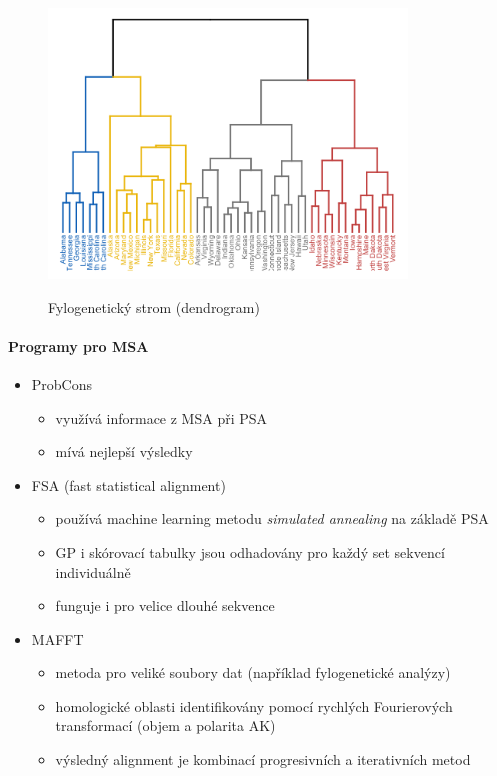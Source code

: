 \documentclass[DIV=8]{scrreprt}
\begin{document}
\begin{figure}
    \caption{Fylogenetický strom (dendrogram)}
    \includegraphics[width=0.85\textwidth]{dendrogram.png}
    \centering
    \label{}
\end{figure}


\paragraph{Programy pro MSA}
\begin{itemize}[nosep]
    \item ProbCons
\begin{itemize}[nosep]
    \item využívá informace z MSA při PSA
    \item mívá nejlepší výsledky
\end{itemize}

    \item FSA (fast statistical alignment)
\begin{itemize}[nosep]
    \item používá machine learning metodu \emph{simulated annealing} na základě PSA
    \item GP i skórovací tabulky jsou odhadovány pro každý set sekvencí individuálně
    \item funguje i pro velice dlouhé sekvence
\end{itemize}

    \item MAFFT
\begin{itemize}[nosep]
    \item metoda pro veliké soubory dat (například fylogenetické analýzy)
    \item homologické oblasti identifikovány pomocí rychlých Fourierových transformací (objem a polarita AK)
    \item výsledný alignment je kombinací progresivních a iterativních metod
\end{itemize}

\end{itemize}
\end{document}

